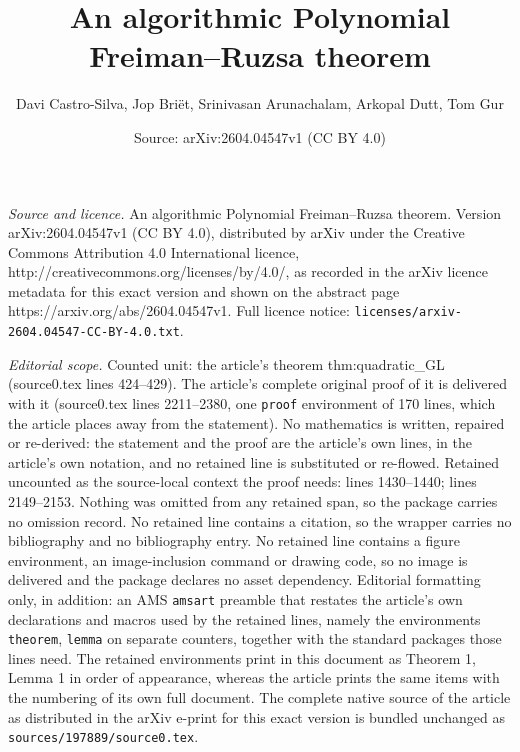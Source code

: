 \documentclass[10pt,a4paper]{amsart}
\title{An algorithmic Polynomial Freiman--Ruzsa theorem}
\author{Davi Castro-Silva, Jop Bri\"et, Srinivasan Arunachalam, Arkopal Dutt, Tom Gur}
\date{Source: arXiv:2604.04547v1 (CC BY 4.0)}
\begin{document}
\maketitle

\noindent\emph{Source and licence.} An algorithmic Polynomial Freiman--Ruzsa theorem. Version arXiv:2604.04547v1 (CC BY 4.0), distributed by arXiv under the Creative Commons Attribution 4.0 International licence, http://creativecommons.org/licenses/by/4.0/, as recorded in the arXiv licence metadata for this exact version and shown on the abstract page https://arxiv.org/abs/2604.04547v1. Full licence notice: \texttt{licenses/arxiv-2604.04547-CC-BY-4.0.txt}.\par\smallskip

\noindent\textit{Editorial scope.} Counted unit: the article's theorem thm:quadratic\_GL (source0.tex lines 424--429). The article's complete original proof of it is delivered with it (source0.tex lines 2211--2380, one \texttt{proof} environment of 170 lines, which the article places away from the statement). No mathematics is written, repaired or re-derived: the statement and the proof are the article's own lines, in the article's own notation, and no retained line is substituted or re-flowed.  Retained uncounted as the source-local context the proof needs: lines 1430--1440; lines 2149--2153.  Nothing was omitted from any retained span, so the package carries no omission record.  No retained line contains a citation, so the wrapper carries no bibliography and no bibliography entry.  No retained line contains a figure environment, an image-inclusion command or drawing code, so no image is delivered and the package declares no asset dependency.  Editorial formatting only, in addition: an AMS \texttt{amsart} preamble that restates the article's own declarations and macros used by the retained lines, namely the environments \texttt{theorem}, \texttt{lemma} on separate counters, together with the standard packages those lines need.  The retained environments print in this document as Theorem 1, Lemma 1 in order of appearance, whereas the article prints the same items with the numbering of its own full document.  The complete native source of the article as distributed in the arXiv e-print for this exact version is bundled unchanged as \texttt{sources/197889/source0.tex}.
\end{document}
